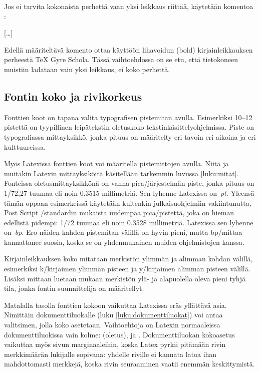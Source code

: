 \pagebreak[3]

Jos ei tarvita kokonaista perhettä vaan yksi leikkaus riittää, käytetään
komentoa :

\begin{koodilohkosis}
  […]
\end{koodilohkosis}

Edellä määriteltävä komento  ottaa käyttöön
lihavoidun (bold) kirjainleikkauksen perheestä TeX Gyre Scho\-la. Tässä
vaih\-to\-eh\-dos\-sa on se etu, että tietokoneen muistiin ladataan vain
yksi leikkaus, ei koko perhettä.

\subsection{Fontin koko ja rivikorkeus}

Fonttien koot on tapana valita typografisen pistemitan avulla.
Esimerkiksi 10--12 pistettä on tyypillinen leipätekstin oletuskoko
teks\-tin\-kä\-sit\-tely\-ohjel\-mis\-sa. Piste on typografiassa
mitta\-yksikkö, jonka pituus on määritelty eri tavoin eri aikoina ja eri
kulttuureissa.

Myös Latexissa fonttien koot voi määritellä pistemittojen avulla. Niitä
ja muitakin Latexin mit\-ta\-yk\-si\-köi\-tä käsitellään tarkemmin
luvussa \ref{luku:mitat}. Fonteissa ole\-tus\-mitta\-yk\-sik\-kö\-nä on
vanha pica\-/järjestelmän piste, jonka pituus on \num{1/72,27} tuumaa
eli noin \num{0,3515} millimetriä. Sen lyhenne Latexissa on~\emph{pt}.
Yleensä tämän oppaan esimerkeissä käytetään kuitenkin
julkaisu\-ohjelmiin vakiintunutta, Post Script \=/standardin mukaista
uudempaa pica\-/pistettä, joka on hieman edellistä pidempi: \num{1/72}
tuumaa eli noin \num{0,3528} millimetriä. Latexissa sen lyhenne
on~\emph{bp}. Ero näiden kahden pistemitan välillä on hyvin pieni, mutta
bp\-/mittaa kannattanee suosia, koska se on yhdenmukainen muiden
ohjelmistojen kanssa.

Kirjainleikkauksen koko mitataan merkistön ylimmän ja alimman kohdan
välillä, esimerkiksi k\=/kirjaimen ylimmän pisteen ja y\=/kirjaimen
alimman pisteen välillä. Lisäksi mittaan luetaan mukaan merkistön ylä-
ja alapuolella oleva pieni tyhjä tila, jonka fontin suunnittelija on
määritellyt.

Matalalla tasolla fonttien kokoon vaikuttaa Latexissa eräs yllättävä
asia. Nimittäin dokumenttiluokalle (luku \ref{luku:dokumenttiluokat})
voi antaa valitsimen, jolla koko asetetaan. Vaihtoehtoja on Latexin
normaaleissa dokumenttiluokissa vain kolme: \koodi{10pt} (oletus),
\koodi{11pt} ja \koodi{12pt}. Dokumenttiluokan koko\-asetus vaikuttaa
myös sivun marginaaleihin, koska Latex pyrkii pitämään rivin
merkkimäärän lukijalle sopivana: yhdelle riville ei kannata latoa ihan
mahdottomasti merkkejä, koska rivin seuraaminen vaatii enemmän
keskittymistä.


